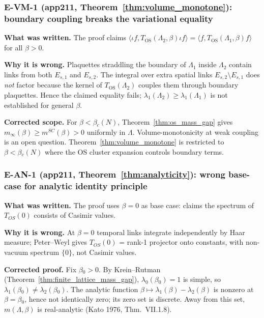 \subsubsection*{E-VM-1 (app211, Theorem~\ref{thm:volume_monotone}): boundary coupling breaks the variational equality}

\noindent{}\textbf{What was written.}
The proof claims $\langle{}\iota{} f, T_{\mathrm{OS}}(\Lambda{}_2,\beta{})\iota{} f\rangle{}=\langle{} f, T_{\mathrm{OS}}(\Lambda{}_1,\beta{}) f\rangle{}$ for all $\beta{}>0$.

\smallskip{}
\noindent{}\textbf{Why it is wrong.}
Plaquettes straddling the boundary of $\Lambda{}_1$ inside $\Lambda{}_2$ contain links from
both $E_{s,1}$ and $E_{s,2}$.
The integral over extra spatial links $E_{s,2}\setminus{} E_{s,1}$ does \emph{not} factor
because the kernel of $T_{\mathrm{OS}}(\Lambda{}_2)$ couples them through boundary plaquettes.
Hence the claimed equality fails; $\lambda{}_1(\Lambda{}_2)\ge{}\lambda{}_1(\Lambda{}_1)$ is not established for general $\beta{}$.

\smallskip{}
\noindent{}\textbf{Corrected scope.}
For $\beta{}<\beta{}_c(N)$, Theorem~\ref{thm:os_mass_gap} gives $m_{\infty{}}(\beta{})\ge{} m^{SC}(\beta{})>0$ uniformly in $\Lambda{}$.
Volume-monotonicity at weak coupling is an open question.
Theorem~\ref{thm:volume_monotone} is restricted to $\beta{}<\beta{}_c(N)$ where the OS cluster expansion controls boundary terms.

\subsubsection*{E-AN-1 (app211, Theorem~\ref{thm:analyticity}): wrong base-case for analytic identity principle}

\noindent{}\textbf{What was written.}
The proof uses $\beta{}=0$ as base case: claims the spectrum of $T_{OS}(0)$ consists of Casimir values.

\smallskip{}
\noindent{}\textbf{Why it is wrong.}
At $\beta{}=0$ temporal links integrate independently by Haar measure; Peter--Weyl gives
$T_{OS}(0)$ = rank-1 projector onto constants, with non-vacuum spectrum $\{{}0\}{}$, not Casimir values.

\smallskip{}
\noindent{}\textbf{Corrected proof.}
Fix $\beta{}_0>0$. By Krein--Rutman (Theorem~\ref{thm:finite_lattice_mass_gap}), $\lambda{}_0(\beta{}_0)=1$ is simple, so $\lambda{}_1(\beta{}_0)\ne{}\lambda{}_2(\beta{}_0)$.
The analytic function $\beta{}\mapsto{}\lambda{}_1(\beta{})-\lambda{}_2(\beta{})$ is nonzero at $\beta{}=\beta{}_0$, hence not identically zero;
its zero set is discrete. Away from this set, $m(\Lambda{},\beta{})$ is real-analytic (Kato 1976, Thm.~VII.1.8).

